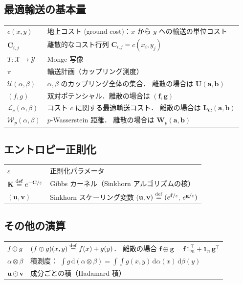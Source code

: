\subsection*{最適輸送の基本量}

\begin{tabular}{lp{28em}}
  $c(x,y)$ & 地上コスト (ground cost)：$x$ から $y$ への輸送の単位コスト \\[3pt]
  $\mathbf{C}_{i,j}$ & 離散的なコスト行列 $\mathbf{C}_{i,j} = c(x_i, y_j)$ \\[3pt]
  $T : \mathcal{X} \to \mathcal{Y}$ & Monge 写像 \\[3pt]
  $\pi$ & 輸送計画（カップリング測度） \\[3pt]
  $\mathcal{U}(\alpha, \beta)$ &
    $\alpha, \beta$ のカップリング全体の集合．
    離散の場合は $\mathbf{U}(\mathbf{a}, \mathbf{b})$ \\[3pt]
  $(f, g)$ & 双対ポテンシャル．離散の場合は $(\mathbf{f}, \mathbf{g})$ \\[3pt]
  $\mathcal{L}_c(\alpha, \beta)$ &
    コスト $c$ に関する最適輸送コスト．
    離散の場合は $\mathbf{L_C}(\mathbf{a}, \mathbf{b})$ \\[3pt]
  $\mathcal{W}_p(\alpha, \beta)$ &
    $p$-Wasserstein 距離．
    離散の場合は $\mathbf{W}_p(\mathbf{a}, \mathbf{b})$
\end{tabular}

\subsection*{エントロピー正則化}

\begin{tabular}{lp{28em}}
  $\varepsilon$ & 正則化パラメータ \\[3pt]
  $\mathbf{K} \overset{\mathrm{def}}{=} e^{-\mathbf{C}/\varepsilon}$ &
    Gibbs カーネル（Sinkhorn アルゴリズムの核） \\[3pt]
  $(\mathbf{u}, \mathbf{v})$ &
    Sinkhorn スケーリング変数
    $(\mathbf{u}, \mathbf{v}) \overset{\mathrm{def}}{=} (e^{\mathbf{f}/\varepsilon},\, e^{\mathbf{g}/\varepsilon})$
\end{tabular}

\subsection*{その他の演算}

\begin{tabular}{lp{28em}}
  $f \oplus g$ & $(f \oplus g)(x,y) \overset{\mathrm{def}}{=} f(x) + g(y)$．
    離散の場合 $\mathbf{f} \oplus \mathbf{g}
    = \mathbf{f}\, \mathbb{1}_m^\top + \mathbb{1}_n\, \mathbf{g}^\top$ \\[3pt]
  $\alpha \otimes \beta$ & 積測度：
    $\int g\, \mathrm{d}(\alpha \otimes \beta)
    = \int\!\!\int g(x,y)\, \mathrm{d}\alpha(x)\, \mathrm{d}\beta(y)$ \\[3pt]
  $\mathbf{u} \odot \mathbf{v}$ & 成分ごとの積（Hadamard 積）
\end{tabular}
